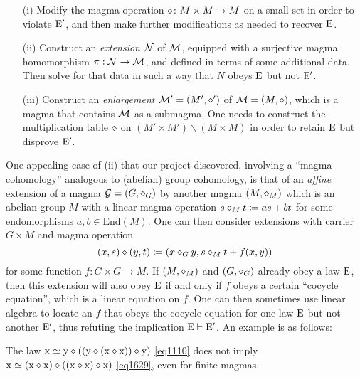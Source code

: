 \begin{itemize}
  \item[(i)]  Modify the magma operation $\diamond \colon M \times M \to M$ on a small set in order to violate ${\mathrm{E}'}$, and then make further modifications as needed to recover $\mathrm{E}$.
  \item[(ii)]  Construct an \emph{extension} ${\mathcal{N}}$ of ${\mathcal{M}}$, equipped with a surjective magma homomorphism $\pi: {\mathcal{N}} \to {\mathcal{M}}$, and defined in terms of some additional data.  Then solve for that data in such a way that $N$ obeys $\mathrm{E}$ but not ${\mathrm{E}'}$.
  \item[(iii)]  Construct an \emph{enlargement} ${\mathcal{M}}' = (M',\diamond')$ of ${\mathcal{M}} = (M,\diamond)$, which is a magma that contains ${\mathcal{M}}$ as a submagma.  One needs to construct the multiplication table $\diamond$ on $(M' \times M') \backslash (M \times M)$ in order to retain $\mathrm{E}$ but disprove ${\mathrm{E}'}$.
\end{itemize}

One appealing case of (ii) that our project discovered, involving a ``magma cohomology'' analogous to (abelian) group cohomology, is that of an \emph{affine} extension of a magma ${\mathcal G} = (G,\diamond_G)$ by another magma $(M,\diamond_M)$ which is an abelian group $M$ with a linear magma operation $s \diamond_M t \coloneqq as + bt$ for some endomorphisms $a,b \in \mathrm{End}(M)$.  One can then consider extensions with carrier $G \times M$ and magma operation
\begin{equation}\label{xsyt}
 (x, s) \diamond (y, t) \coloneqq (x \diamond_G y, s \diamond_M t + f(x,y))
\end{equation}
for some function $f \colon G \times G \to M$.  If $(M,\diamond_M)$ and $(G,\diamond_G)$ already obey a law $\mathrm{E}$, then this extension will also obey $\mathrm{E}$ if and only if $f$ obeys a certain ``cocycle equation'', which is a linear equation on $f$.  One can then sometimes use linear algebra to locate an $f$ that obeys the cocycle equation for one law $\mathrm{E}$ but not another ${\mathrm{E}'}$, thus refuting the implication $\mathrm{E} \vdash {\mathrm{E}'}$.  An example is as follows:

\begin{proposition}\label{1110-1629} The law $\mathrm{x} \simeq \mathrm{y} \diamond ((\mathrm{y} \diamond (\mathrm{x} \diamond \mathrm{x})) \diamond \mathrm{y})$ \eqref{eq1110} does not imply $\mathrm{x} \simeq (\mathrm{x} \diamond \mathrm{x}) \diamond ((\mathrm{x} \diamond \mathrm{x}) \diamond \mathrm{x})$ \eqref{eq1629}, even for finite magmas.
\end{proposition}

